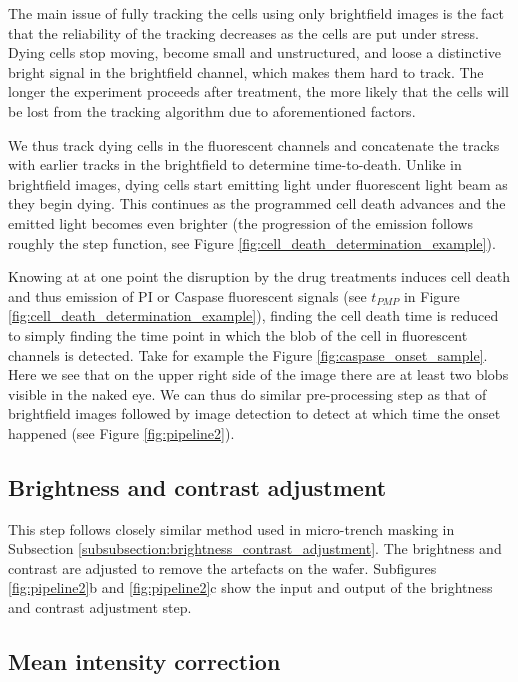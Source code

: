 \documentclass[pdftex,12pt,a4paper]{report}
\begin{document}
The main issue of fully tracking the cells using only brightfield images is the fact that the reliability of the tracking decreases as the cells are put under stress. Dying cells stop moving, become small and unstructured, and loose a distinctive bright signal in the brightfield channel, which makes them hard to track. The longer the experiment proceeds after treatment, the more likely that the cells will be lost from the tracking algorithm due to aforementioned factors.

We thus track dying cells in the fluorescent channels and concatenate the tracks with earlier tracks in the brightfield to determine time-to-death. Unlike in brightfield images, dying cells start emitting light under fluorescent light beam as they begin dying. This continues as the programmed cell death advances and the emitted light becomes even brighter (the progression of the emission follows roughly the step function, see Figure \ref{fig:cell_death_determination_example}).

Knowing at at one point the disruption by the drug treatments induces cell death and thus emission of PI or Caspase fluorescent signals (see $t_{PMP}$ in Figure \ref{fig:cell_death_determination_example}), finding the cell death time is reduced to simply finding the time point in which the blob of the cell in fluorescent channels is detected. Take for example the Figure \ref{fig:caspase_onset_sample}. Here we see that on the upper right side of the image there are at least two blobs visible in the naked eye. We can thus do similar pre-processing step as that of brightfield images followed by image detection to detect at which time the onset happened (see Figure \ref{fig:pipeline2}).

\subsection{Brightness and contrast adjustment}

This step follows closely similar method used in micro-trench masking in Subsection \ref{subsubsection:brightness_contrast_adjustment}. The brightness and contrast are adjusted to remove the artefacts on the wafer. Subfigures \ref{fig:pipeline2}b and \ref{fig:pipeline2}c show the input and output of the brightness and contrast adjustment step.

\subsection{Mean intensity correction}
\end{document}
